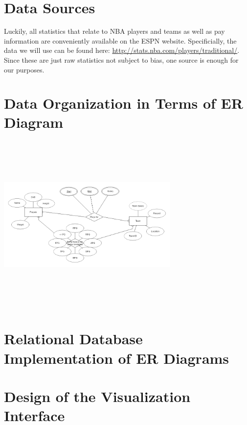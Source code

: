 \documentclass[journal]{vgtc}                %
\begin{document}
\section{Data Sources}
Luckily, all statistics that relate to NBA players and teams as well as pay information are conveniently available on the ESPN website. Specificially, the data we will use can be found here: \url{http://stats.nba.com/players/traditional/}. Since these are just raw statistics not subject to bias, one source is enough for our purposes.

\section{Data Organization in Terms of ER Diagram}
\includegraphics[width=9cm, height=9cm]{ERdiagram}

\section{Relational Database Implementation of ER Diagrams}

\section{Design of the Visualization Interface}



\end{document}
